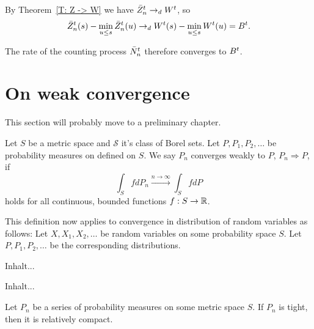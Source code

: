 By Theorem~\ref{T: Z -> W} we have $\bar{Z}^t_n \rightarrow_d W^t$,
so
\begin{equation}
\bar{Z}^t_n(s) - \min_{u \leq s}\bar{Z}^t_n(u) \rightarrow_d W^t(s) - \min_{u \leq s}W^t(u) = B^t.
\end{equation}


The rate of the counting process $\bar{N}_n^t$ therefore converges to $B^t$.


\section{On weak convergence}

This section will probably move to a preliminary chapter.
\begin{definition}
	Let $S$ be a metric space and $\mathcal{S}$ it's class of Borel sets.
	Let $P, P_1, P_2, \dots$ be probability measures on defined on $S$.
	We say $P_n$ converges weakly to $P$, $P_n \Rightarrow P$, if
	\begin{equation} 
	\int_S fdP_n \xrightarrow{n \rightarrow \infty} \int_S fdP
	\end{equation}
	holds for all continuous, bounded functions $f: S \rightarrow \mathbb{R}$.
\end{definition}

This definition now applies to convergence in distribution of random variables as follows:
Let $X, X_1, X_2, \dots$ be random variables on some probability space $S$.
Let $P, P_1, P_2, \dots$ be the corresponding distributions. 

\begin{definition}[Tightness] \label{D: Tightness}
	Inhalt...
\end{definition}

\begin{definition} \label{D: Rel Compactness}
	Inhalt...
\end{definition}

\begin{theorem} \label{T: Prohorov}
	Let $P_n$ be a series of probability measures on some metric space $S$. If $P_n$ is tight, then it is relatively compact.
\end{theorem}




